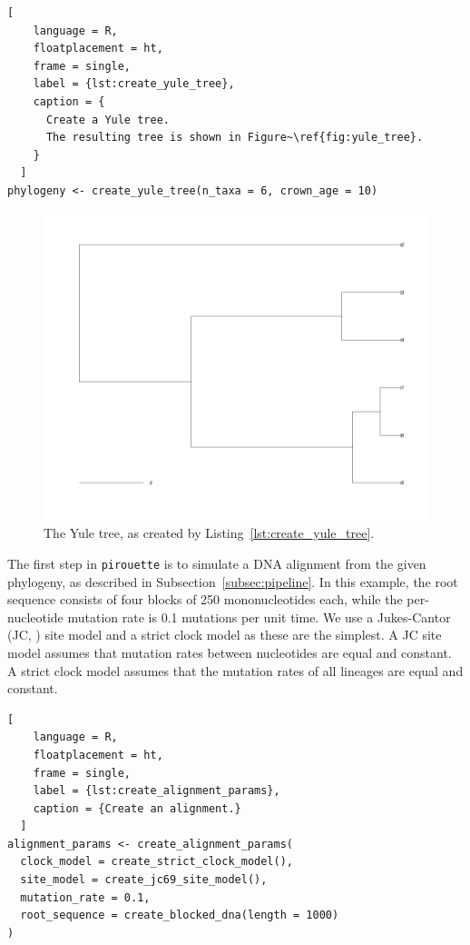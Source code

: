 \begin{lstlisting}[
    language = R,
    floatplacement = ht,
    frame = single, 
    label = {lst:create_yule_tree}, 
    caption = {
      Create a Yule tree. 
      The resulting tree is shown in Figure~\ref{fig:yule_tree}.
    }
  ]
phylogeny <- create_yule_tree(n_taxa = 6, crown_age = 10)
\end{lstlisting}

\begin{figure}[ht]
  \includegraphics[width=\textwidth]{example_1/true_tree.png}
  \caption{The Yule tree, as created by Listing~\ref{lst:create_yule_tree}.}
  \label{fig:yule_tree}
\end{figure}

The first step in \verb;pirouette; is to simulate a DNA alignment from the 
given phylogeny, as described in Subsection~\ref{subsec:pipeline}.
In this example, the root sequence consists of four blocks of 250 
mononucleotides each, while the per-nucleotide mutation rate is 
0.1 mutations per unit time.
We use a Jukes-Cantor (JC, \cite{jukes1969evolution}) site model
and a strict clock model as these are the simplest.
A JC site model assumes that mutation rates between nucleotides are equal and 
constant. 
A strict clock model assumes that the mutation rates 
of all lineages are equal and constant.

\begin{lstlisting}[
    language = R,
    floatplacement = ht,
    frame = single,
    label = {lst:create_alignment_params}, 
    caption = {Create an alignment.}
  ]
alignment_params <- create_alignment_params(
  clock_model = create_strict_clock_model(),
  site_model = create_jc69_site_model(),
  mutation_rate = 0.1,
  root_sequence = create_blocked_dna(length = 1000)
)
\end{lstlisting}

